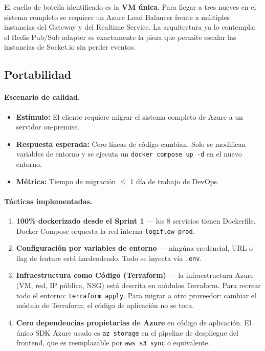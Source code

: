 \documentclass[12pt,a4paper,oneside]{article}
\begin{document}
El cuello de botella identificado es la \textbf{VM \'unica}. Para llegar a tres nueves en el sistema completo se requiere un Azure Load Balancer frente a m\'ultiples instancias del Gateway y del Realtime Service. La arquitectura ya lo contempla: el Redis Pub/Sub adapter es exactamente la pieza que permite escalar las instancias de Socket.io sin perder eventos.

\subsection{Portabilidad}

\paragraph{Escenario de calidad.}
\begin{itemize}[leftmargin=*]
  \item \textbf{Est\'imulo:} El cliente requiere migrar el sistema completo de Azure a un servidor on-premise.
  \item \textbf{Respuesta esperada:} Cero l\'ineas de c\'odigo cambian. Solo se modifican variables de entorno y se ejecuta un \texttt{docker compose up -d} en el nuevo entorno.
  \item \textbf{M\'etrica:} Tiempo de migraci\'on $\leq$ 1 d\'ia de trabajo de DevOps.
\end{itemize}

\paragraph{T\'acticas implementadas.}

\begin{enumerate}[leftmargin=*]
  \item \textbf{100\% dockerizado desde el Sprint 1} --- los 8 servicios tienen Dockerfile. Docker Compose orquesta la red interna \texttt{logiflow-prod}.
  \item \textbf{Configuraci\'on por variables de entorno} --- ning\'una credencial, URL o flag de feature est\'a hardcodeado. Todo se inyecta v\'ia \texttt{.env}.
  \item \textbf{Infraestructura como C\'odigo (Terraform)} --- la infraestructura Azure (VM, red, IP p\'ublica, NSG) est\'a descrita en m\'odulos Terraform. Para recrear todo el entorno: \texttt{terraform apply}. Para migrar a otro proveedor: cambiar el m\'odulo de Terraform; el c\'odigo de aplicaci\'on no se toca.
  \item \textbf{Cero dependencias propietarias de Azure} en c\'odigo de aplicaci\'on. El \'unico SDK Azure usado es \texttt{az storage} en el pipeline de despliegue del frontend, que es reemplazable por \texttt{aws s3 sync} o equivalente.
\end{enumerate}
\end{document}

